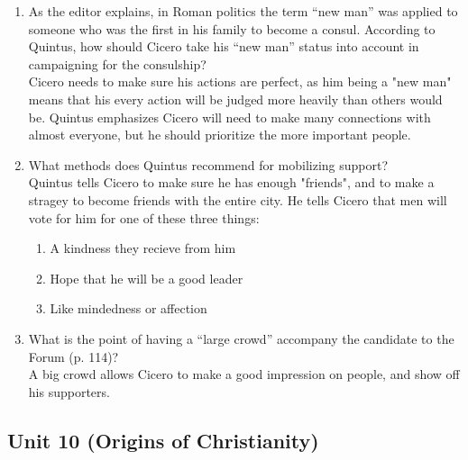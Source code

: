 \documentclass{article}
\begin{document}
\begin{enumerate}
  \item As the editor explains, in Roman politics the term “new man” was applied to someone
  who was the first in his family to become a consul. According to Quintus, how should Cicero
  take his “new man” status into account in campaigning for the consulship? \\
  Cicero needs to make sure his actions are perfect, as him being a "new man" means that
  his every action will be judged more heavily than others would be. Quintus emphasizes
  Cicero will need to make many connections with almost everyone, but he should prioritize
  the more important people.
  \item What methods does Quintus recommend for mobilizing support? \\
  Quintus tells Cicero to make sure he has enough "friends", and to make a stragey to
  become friends with the entire city. He tells Cicero that men will vote for him for one of
  these three things:
  \begin{enumerate}
    \item A kindness they recieve from him
    \item Hope that he will be a good leader
    \item Like mindedness or affection
  \end{enumerate}
  \item What is the point of having a “large crowd” accompany the candidate to the Forum
  (p. 114)? \\
  A big crowd allows Cicero to make a good impression on people, and show off his
  supporters.
\end{enumerate}
\subsection*{Unit 10 (Origins of Christianity)}
\end{document}
